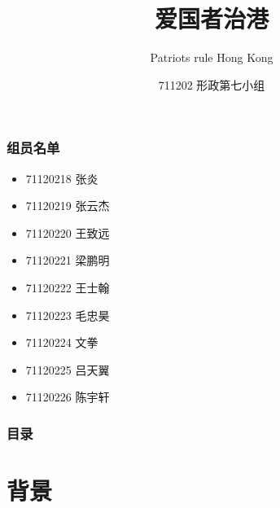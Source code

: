 \documentclass{ctexbeamer}
\title{爱国者治港}
\subtitle{Patriots rule Hong Kong}
\author{
    711202 形政第七小组
}
\begin{document}
    \begin{frame}
        \maketitle
    \end{frame}

    \begin{frame}
        \frametitle{组员名单}
    
        \begin{center}
            \begin{itemize}
                \centering
                \item 71120218 张炎
                \item 71120219 张云杰
                \item 71120220 王致远
                \item 71120221 梁鹏明
                \item 71120222 王士翰
                \item 71120223 毛忠昊
                \item 71120224 文拳
                \item 71120225 吕天翼
                \item 71120226 陈宇轩
            \end{itemize}
        \end{center}
    
    \end{frame}

    \begin{frame}
        \frametitle{目录}
    
        \tableofcontents
    
    \end{frame}

    \section{背景}
\end{document}
